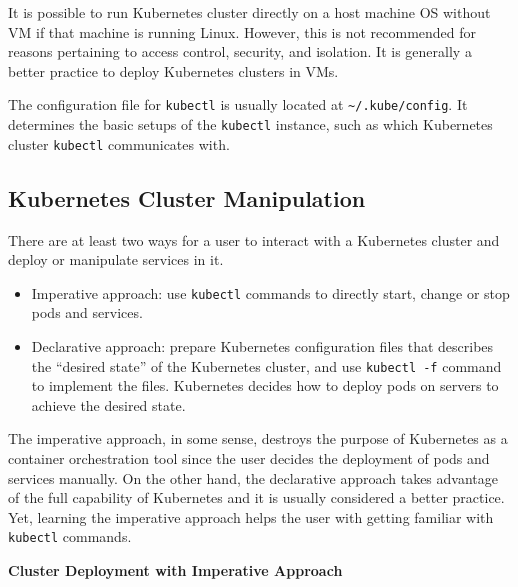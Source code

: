 It is possible to run Kubernetes cluster directly on a host machine OS without VM if that machine is running Linux. However, this is not recommended for reasons pertaining to access control, security, and isolation. It is generally a better practice to deploy Kubernetes clusters in VMs.

The configuration file for \verb|kubectl| is usually located at \verb|~/.kube/config|. It determines the basic setups of the \verb|kubectl| instance, such as which Kubernetes cluster \verb|kubectl| communicates with.

\subsection{Kubernetes Cluster Manipulation}

There are at least two ways for a user to interact with a Kubernetes cluster and deploy or manipulate services in it.
\begin{itemize}
  \item Imperative approach: use \verb|kubectl| commands to directly start, change or stop pods and services.
  \item Declarative approach: prepare Kubernetes configuration files that describes the ``desired state'' of the Kubernetes cluster, and use \verb|kubectl -f| command to implement the files. Kubernetes decides how to deploy pods on servers to achieve the desired state.
\end{itemize}
The imperative approach, in some sense, destroys the purpose of Kubernetes as a container orchestration tool since the user decides the deployment of pods and services manually. On the other hand, the declarative approach takes advantage of the full capability of Kubernetes and it is usually considered a better practice. Yet, learning the imperative approach helps the user with getting familiar with \verb|kubectl| commands.

\vspace{0.1in}
\noindent \textbf{Cluster Deployment with Imperative Approach}
\vspace{0.1in}


